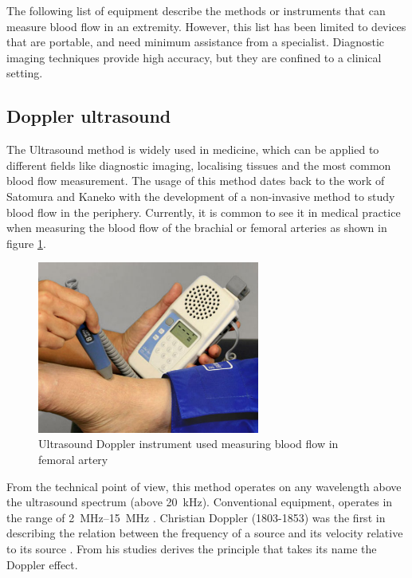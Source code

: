 The following list of equipment describe the methods or instruments that can measure blood flow in an extremity. However, this list has been limited to devices that are portable, and need minimum assistance from a specialist. Diagnostic imaging techniques provide high accuracy, but they are confined to a clinical setting.

\subsection{Doppler ultrasound}
\label{section literature UD}
The Ultrasound method is widely used in medicine, which can be applied to different fields like diagnostic imaging, localising tissues and the most common blood flow measurement. The usage of this method dates back to the work of Satomura and Kaneko \cite{satomura1959study} with the development of a non-invasive method to study blood flow in the periphery. Currently, it is common to see it in medical practice when measuring the blood flow of the brachial or femoral arteries \cite{casey2008measuring} as shown in figure \ref{fig:UD Instrument}. 

\begin{figure}[!htpb]
	\centering
	\includegraphics[width=0.65\textwidth,keepaspectratio]{ultrasound_doppler}    
	\caption[Ultrasound Doppler instrument]{Ultrasound Doppler instrument used measuring blood flow in femoral artery \cite{ultrasoundinstrument}}
	\label{fig:UD Instrument}
\end{figure}

From the technical point of view, this method operates on any wavelength above the ultrasound spectrum (above \SI{20}{\kilo\hertz}). Conventional equipment, operates in the range of \SIrange{2}{15}{\mega\hertz} \cite{jayanthy2011measuring}. Christian Doppler (1803-1853) was the first in describing the relation between the frequency of a source and its velocity relative to its source \cite{surgeonhand2002Hand}. From his studies derives the principle that takes its name the Doppler effect. 

